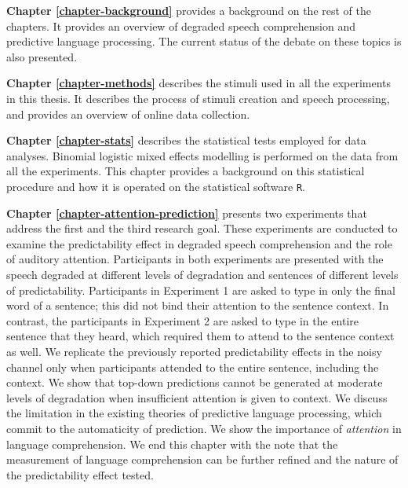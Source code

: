 \documentclass[a4paper, nobind]{templates/ociamthesis}
\begin{document}
\noindent
\textbf{Chapter \ref{chapter-background}} provides a background on the rest of the chapters.
It provides an overview of degraded speech comprehension and predictive language processing.
The current status of the debate on these topics is also presented.

\noindent
\textbf{Chapter \ref{chapter-methods}} describes the stimuli used in all the experiments in this thesis.
It describes the process of stimuli creation and speech processing, and provides an overview of online data collection.

\noindent
\textbf{Chapter \ref{chapter-stats}} describes the statistical tests employed for data analyses.
Binomial logistic mixed effects modelling is performed on the data from all the experiments.
This chapter provides a background on this statistical procedure
and how it is operated on the statistical software \texttt{R}.

\noindent
\textbf{Chapter \ref{chapter-attention-prediction}} presents two experiments that address the first and the third research goal.
These experiments are conducted to examine the predictability effect in degraded speech comprehension
and the role of auditory attention.
Participants in both experiments are presented with the speech degraded at different levels of degradation
and sentences of different levels of predictability.
Participants in Experiment 1 are asked to type in only the final word of a sentence;
this did not bind their attention to the sentence context.
In contrast, the participants in Experiment 2 are asked to type in the entire sentence that they heard, which required them to attend to the sentence context as well.
We replicate the previously reported predictability effects in the noisy channel only when participants attended to the entire sentence, including the context.
We show that top-down predictions cannot be generated at moderate levels of degradation when insufficient attention is given to context.
We discuss the limitation in the existing theories of predictive language processing, which commit to the automaticity of prediction.
We show the importance of \emph{attention} in language comprehension.
We end this chapter with the note that the measurement of language comprehension can be further refined
and the nature of the predictability effect tested.
\end{document}
